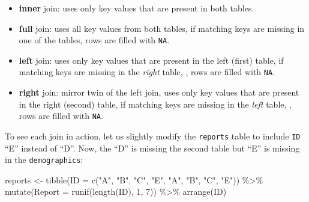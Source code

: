 \documentclass[
]{book}
\newenvironment{Shaded}{\begin{snugshade}}{\end{snugshade}}
\newcommand{\AttributeTok}[1]{\textcolor[rgb]{0.77,0.63,0.00}{#1}}
\newcommand{\DecValTok}[1]{\textcolor[rgb]{0.00,0.00,0.81}{#1}}
\newcommand{\FunctionTok}[1]{\textcolor[rgb]{0.00,0.00,0.00}{#1}}
\newcommand{\NormalTok}[1]{#1}
\newcommand{\OtherTok}[1]{\textcolor[rgb]{0.56,0.35,0.01}{#1}}
\newcommand{\SpecialCharTok}[1]{\textcolor[rgb]{0.00,0.00,0.00}{#1}}
\newcommand{\StringTok}[1]{\textcolor[rgb]{0.31,0.60,0.02}{#1}}
\providecommand{\tightlist}{%
  \setlength{\itemsep}{0pt}\setlength{\parskip}{0pt}}
\begin{document}
\begin{itemize}
\tightlist
\item
  \textbf{inner} join: uses only key values that are present in both tables.
\item
  \textbf{full} join: uses all key values from both tables, if matching keys are missing in one of the tables, rows are filled with \texttt{NA}.
\item
  \textbf{left} join: uses only key values that are present in the left (first) table, if matching keys are missing in the \emph{right} table, , rows are filled with \texttt{NA}.
\item
  \textbf{right} join: mirror twin of the left join, uses only key values that are present in the right (second) table, if matching keys are missing in the \emph{left} table, , rows are filled with \texttt{NA}.
\end{itemize}

To see each join in action, let us slightly modify the \texttt{reports} table to include \texttt{ID} ``E'' instead of ``D''. Now, the ``D'' is missing the second table but ``E'' is missing in the \texttt{demographics}:

\begin{Shaded}
\begin{Highlighting}[]
\NormalTok{reports }\OtherTok{\textless{}{-}} 
  \FunctionTok{tibble}\NormalTok{(}\AttributeTok{ID =} \FunctionTok{c}\NormalTok{(}\StringTok{"A"}\NormalTok{, }\StringTok{"B"}\NormalTok{, }\StringTok{"C"}\NormalTok{, }\StringTok{"E"}\NormalTok{, }\StringTok{"A"}\NormalTok{, }\StringTok{"B"}\NormalTok{, }\StringTok{"C"}\NormalTok{, }\StringTok{"E"}\NormalTok{)) }\SpecialCharTok{\%\textgreater{}\%}
  \FunctionTok{mutate}\NormalTok{(}\AttributeTok{Report =} \FunctionTok{runif}\NormalTok{(}\FunctionTok{length}\NormalTok{(ID), }\DecValTok{1}\NormalTok{, }\DecValTok{7}\NormalTok{)) }\SpecialCharTok{\%\textgreater{}\%}
  \FunctionTok{arrange}\NormalTok{(ID)}
\end{Highlighting}
\end{Shaded}
\end{document}
